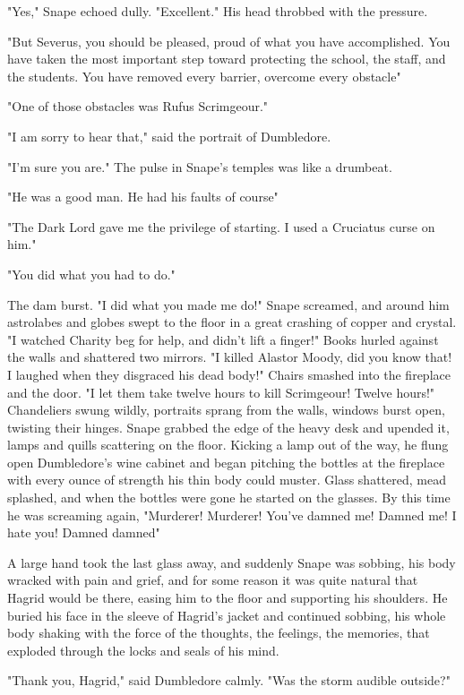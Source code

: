 "Yes," Snape echoed dully. "Excellent." His head throbbed with the pressure.

"But Severus, you should be pleased, proud of what you have accomplished. You have taken the most important step toward protecting the school, the staff, and the students. You have removed every barrier, overcome every obstacle{\el}"

"One of those obstacles was Rufus Scrimgeour."

"I am sorry to hear that," said the portrait of Dumbledore.

"I'm sure you are." The pulse in Snape's temples was like a drumbeat.

"He was a good man. He had his faults of course{\el}"

"The Dark Lord gave me the privilege of starting. I used a Cruciatus curse on him."

"You did what you had to do."

The dam burst. "I did what you made me do!" Snape screamed, and around him astrolabes and globes swept to the floor in a great crashing of copper and crystal. "I watched Charity beg for help, and didn't lift a finger!" Books hurled against the walls and shattered two mirrors. "I killed Alastor Moody, did you know that! I laughed when they disgraced his dead body!" Chairs smashed into the fireplace and the door. "I let them take twelve hours to kill Scrimgeour! Twelve hours!" Chandeliers swung wildly, portraits sprang from the walls, windows burst open, twisting their hinges. Snape grabbed the edge of the heavy desk and upended it, lamps and quills scattering on the floor. Kicking a lamp out of the way, he flung open Dumbledore's wine cabinet and began pitching the bottles at the fireplace with every ounce of strength his thin body could muster. Glass shattered, mead splashed, and when the bottles were gone he started on the glasses. By this time he was screaming again, "Murderer! Murderer! You've damned me! Damned me! I hate you! Damned{\el} damned{\el}"

A large hand took the last glass away, and suddenly Snape was sobbing, his body wracked with pain and grief, and for some reason it was quite natural that Hagrid would be there, easing him to the floor and supporting his shoulders. He buried his face in the sleeve of Hagrid's jacket and continued sobbing, his whole body shaking with the force of the thoughts, the feelings, the memories, that exploded through the locks and seals of his mind.

"Thank you, Hagrid," said Dumbledore calmly. "Was the storm audible outside?"

